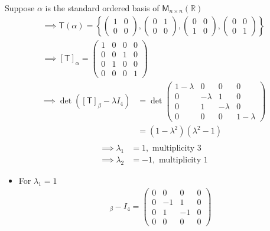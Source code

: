 \begin{enumerate}
Suppose $\alpha$ is the standard ordered basis of $\mathsf{M}_{n\times
  n}(\mathbb{R})$
\begin{gather}
\implies \mathsf{T}(\alpha) =\left\{\begin{pmatrix}1&0\\0 &
    0\end{pmatrix},\begin{pmatrix}0&1\\0& 0\end{pmatrix},\begin{pmatrix}0
    & 0 \\1&0\end{pmatrix},\begin{pmatrix}0& 0
    \\0&1\end{pmatrix}\right\}\\
\implies [\mathsf{T}]_\alpha = \begin{pmatrix}
1 & 0 & 0 & 0\\
0 & 0 & 1 & 0\\
0 & 1 & 0 & 0\\
0 & 0 & 0 & 1
\end{pmatrix}
\end{gather}
\begin{align}
\implies \det{([\mathsf{T}]_\beta-\lambda I_4)} &= \det{
\begin{pmatrix}
1-\lambda & 0 & 0 & 0\\
0 & -\lambda & 1 &  0\\
0 & 1 & -\lambda & 0\\
0 & 0 &0 & 1-\lambda
\end{pmatrix}
}\\
&=(1-\lambda^2)(\lambda^2-1)\\
\end{align}
\begin{align}
\implies \lambda_1 &= 1, \text{ multiplicity } 3\\
\implies \lambda_2 &= -1, \text{ multiplicity } 1
\end{align}
\begin{itemize}
\item For $\lambda_1 = 1$
\begin{gather}
[\mathsf{T}]_\beta -I_4 =
\begin{pmatrix}
0 & 0 & 0 & 0\\
0 & -1 & 1 & 0\\
0 & 1 & -1 & 0\\
0 & 0 & 0 & 0
\end{pmatrix}\\

\end{gather}
\end{itemize}
\end{enumerate}

